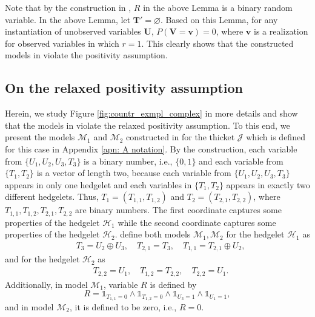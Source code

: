 \documentclass[accepted]{uai2022}
\newcommand{\Pa}[2]{\textit{Pa}_{#2}(#1)}
\newcommand{\V}[0]{\mathbf{V}}
\newcommand{\U}[0]{\mathbf{U}}
\newcommand{\X}[0]{\mathbf{X}}
\newcommand{\T}[0]{\mathbf{T}}
\newcommand{\G}[0]{\mathcal{G}}
\newcommand{\M}[0]{\mathcal{M}}
\begin{document}
        Note that by the construction in \citep{lee2019general}, $R$ in the above Lemma is a binary random variable. 
        In the above Lemma, let $\T' = \varnothing$. 
        Based on this Lemma, for any instantiation of unobserved variables $\U$, $P(\V=\mathbf{v})=0$, where $\textbf{v}$ is a realization for observed variables in which $r=1$. 
        This clearly shows that the constructed models in \citep{lee2019general} violate the positivity assumption.

    \subsection{On the relaxed positivity assumption }

        Herein, we study Figure \ref{fig:countr_exmpl_complex} in more details and show that the models in \citep{lee2019general} violate the relaxed positivity assumption. 
        To this end, we present the models $\M_1$ and $\M_2$ constructed in \citep{lee2019general} for the thicket $\mathcal{J}$ which is defined for this case in Appendix \ref{apn: A notation}. 
        By the construction, each variable from $\{U_1, U_2, U_3, T_3\}$ is a binary number, i.e., $\{0, 1\}$ and each variable from $\{T_1, T_2\}$ is a vector of length two, because each variable from $\{U_1, U_2, U_3, T_3\}$ appears in only one hedgelet and each variables in $\{T_1, T_2\}$ appears in exactly two different hedgelets. 
        Thus, $T_1=(T_{1, 1}, T_{1, 2})$ and $T_2 = (T_{2, 1}, T_{2, 2})$, where $T_{1, 1}, T_{1, 2}, T_{2, 1}, T_{2, 2}$ are binary numbers. The first coordinate captures some properties of the hedgelet $\mathcal{H}_1$ while the second coordinate captures some properties of the hedgelet $\mathcal{H}_2$. 
        \cite{lee2019general} define both models $\M_1, \M_2$ for the hedgelet $\mathcal{H}_1$ as
        \begin{align*}
            & T_3 = U_2 \oplus U_3, \quad T_{2, 1} = T_3, \quad T_{1, 1} = T_{2, 1} \oplus U_2,
        \end{align*}
        and for the hedgelet $\mathcal{H}_2$ as
        \begin{align*}
            & T_{2, 2} = U_1, \quad T_{1, 2} = T_{2, 2}, \quad T_{2, 2} = U_1.
        \end{align*}
        Additionally, in model $\M_1$, variable $R$ is defined by
        \begin{equation*}
            R = \mathds{1}_{T_{1, 1} = 0} \wedge \mathds{1}_{T_{1, 2}=0} \wedge \mathds{1}_{U_3=1} \wedge \mathds{1}_{U_{1} = 1},
        \end{equation*}
        and in model $\M_2$, it is defined to be zero, i.e., $R = 0$.
\end{document}
